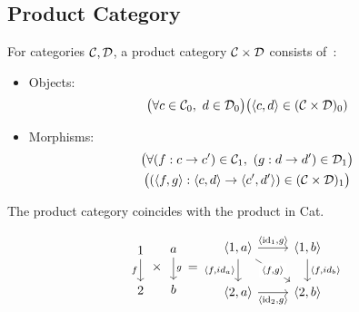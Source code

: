 \subsection{Product Category}
\begin{definition}
  For categories $\mathcal{C},\mathcal{D}$, a product category $\mathcal{C}\times \mathcal{D}$ consists
  of~\parencite{awodey:category_theory}:

  \begin{itemize}
    \item Objects:
      \[\big(\forall c \in \mathcal{C}_0,\ d \in \mathcal{D}_0\big)
        \big(\langle c, d\rangle\in (\mathcal{C}\times \mathcal{D})_0)\]
    \item Morphisms:
      \[
        \begin{gathered}
          \big(\forall (f: c \to c')\in \mathcal{C}_1,\ (g:d \to d')\in \mathcal{D}_1\big)\\
          \big((\langle f,g\rangle : \langle c,d\rangle \to \langle c', d'\rangle)\in (\mathcal{C}\times \mathcal{D})_1\big)
        \end{gathered}
      \]
  \end{itemize}
\end{definition}

\begin{remark}
  The product category coincides with the product in Cat.
\end{remark}

\begin{example}
  \[
    \begin{tikzcd}[ampersand replacement=\&]
      1 \\
      2
      \arrow["f"', from=1-1, to=2-1]
    \end{tikzcd}
    \times
    \begin{tikzcd}
      a \\
      b
      \arrow["g", from=1-1, to=2-1]
    \end{tikzcd}
    =
    \begin{tikzcd}[ampersand replacement=\&]
      {\langle1,a\rangle} \& {\langle1,b\rangle} \\
      {\langle2,a\rangle} \& {\langle2,b\rangle}
      \arrow["{\langle \id_1,g\rangle}", from=1-1, to=1-2]
      \arrow["{\langle f,id_a\rangle}"', from=1-1, to=2-1]
      \arrow["{\langle \id_2,g\rangle}"', from=2-1, to=2-2]
      \arrow["{\langle f,id_b\rangle}", from=1-2, to=2-2]
      \arrow["{\langle f,g\rangle}"{description}, from=1-1, to=2-2]
    \end{tikzcd}
  \]
\end{example}

